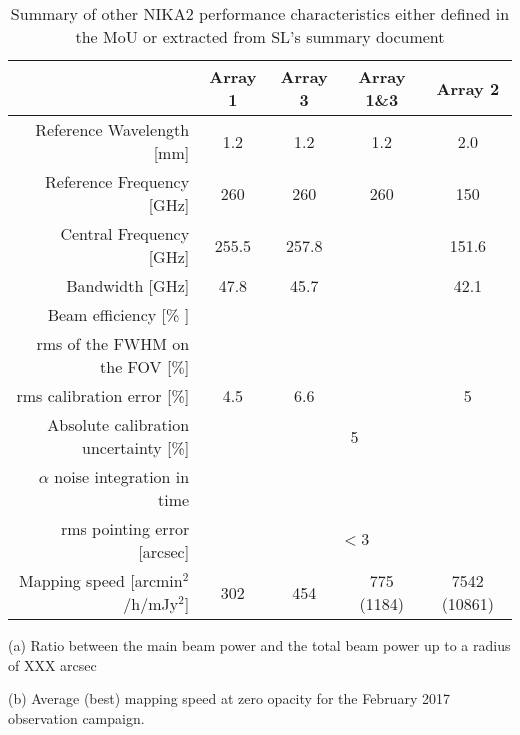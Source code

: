 \begin{table}[h]
  \caption[Secondary performance measurements]{Summary of other NIKA2 performance characteristics either defined in the MoU or extracted from SL's summary document}
  \label{nika2summary_second}
  \begin{threeparttable}
    \begin{tabular}{|r|c|c|c|c|}
      \hline
      & Array 1 & Array 3  & Array 1\&3 & Array 2 \\
      \hline
      \hline
      Reference Wavelength  [mm]  &  1.2   &  1.2  & 1.2 & 2.0   \\
      Reference Frequency  [GHz]  &  260   &  260  & 260 & 150  \\
      Central Frequency [GHz]     &  255.5  &    257.8     &     &   151.6  \\
      Bandwidth         [GHz]     &   47.8  &     45.7     &     &    42.1  \\
      \hline
      Beam efficiency\tnote{a}\hspace{1mm} [\% ]    &        &    &     &    \\
      rms of the FWHM on the FOV [$\%$]   &   &    &   &  \\
      \hline 
      rms calibration error [\%]            & 4.5  & 6.6  &   & 5  \\
      \hline
      Absolute calibration uncertainty [\%] &  \multicolumn{4}{|c|}{5} \\
      \hline
      $\alpha$ noise integration in time\tnote{d}\hspace{1mm}  &   &   &   &  \\
      \hline
      rms pointing error    [arcsec]    & \multicolumn{4}{|c|}{$<3$}  \\
      \hline
      Mapping speed\tnote{b}\hspace{1mm} [arcmin$^2$/h/mJy$^2$] & 302  & 454  & 775 (1184)  & 7542 (10861)  \\
\hline

\end{tabular}
  \begin{tablenotes}
  \item[(a)] Ratio between the main beam power and the total beam power up to a radius of XXX arcsec
  \item[(b)] Average (best) mapping speed at zero opacity for the February 2017 observation campaign. 
  \end{tablenotes}
\end{threeparttable}
\end{table}
